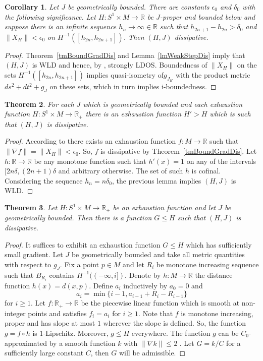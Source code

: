 \documentclass[11pt]{amsart}
\newcommand{\R}{\mathbb{R}}
\newtheorem{tm}{Theorem}[section]
\newtheorem{cy}[tm]{Corollary}
\theoremstyle{definition}
\theoremstyle{remark}
\begin{document}
\begin{cy}\label{cwWeakDisCofinal}
Let $J$ be geometrically bounded. There are constants $\epsilon_0$ and $\delta_0$ with the following significance. Let $H:S^1\times M\to\R$ be $J$-proper and bounded below and suppose there is an infinite sequence $h_n\to\infty\in\R$  such that $h_{2n+1}-h_{2n}>\delta_0$ and $\|X_H\|<\epsilon_0$ on $H^{-1}([ h_{2n},h_{2n+1}])$.  Then $(H,J)$ dissipative.
\end{cy}
\begin{proof}
Theorem~\ref{tmBoundGradDis} and Lemma~\ref{lmWeakStepDis} imply that $(H,J)$ is WLD and hence, by , strongly LDOS. Boundedness of $\|X_H\|$ on the sets $H^{-1}([ h_{2n},h_{2n+1}])$ implies quasi-isometry of$g_{J_H}$ with the product metric $ds^2+dt^2+g_J$ on these sets, which in turn implies i-boundedness.
\end{proof}
\begin{tm}\label{tmDregCofinal}For each $J$ which is geometrically bounded and each exhaustion function $H:S^1\times M\to\R_+$ there is an exhaustion function $H'>H$ which is such that $(H,J)$ is dissipative.
\end{tm}
\begin{proof}
According to \cite{GreeneWu}  there exists an exhaustion function $f:M\to \R$ such that $\|\nabla f\|=\|X_H\|<\epsilon_0$.  So, $f$ is dissipative by Theorem~\ref{tmBoundGradDis}.  Let $h:\R\to\R$ be any monotone function such that $h'(x)=1$ on any of the intervals $[2n\delta,(2n+1)\delta$ and arbitrary otherwise. The set of such $h$ is cofinal. Considering the sequence $h_n=n\delta_0$, the previous lemma implies $(H,J)$ is WLD.
\end{proof}
\begin{tm}\label{lmExDisDom}
Let $H:S^1\times M\to\R_+$ be an exhaustion function and let $J$ be geometrically bounded. Then there is a function $G\leq H$ such that $(H,J)$ is dissipative.
\end{tm}
\begin{proof}
It suffices to exhibit an exhaustion function $G\leq H$ which has sufficiently small gradient. Let $J$ be geometrically bounded and take all metric quantities with respect to $g_J$. Fix a point $p\in M$ and let $R_i$ be monotone increasing sequence such that $B_{R_i}$ contains $H^{-1}((-\infty,i])$. Denote by $h:M\to\R$ the distance function $h(x)=d(x,p)$. Define $a_i$ inductively by $a_0=0$ and
\[
a_i=\min\{i-1,a_{i-1}+R_i-R_{i-1}\}
\]
for $i\geq 1$. Let $f:\R_+\to\R$ be the piecewise linear function which is smooth at non-integer points and satisfies $f_i=a_i$ for $i\geq 1$. Note that $f$ is monotone increasing, proper and has slope at most $1$ wherever the slope is defined. So, the function $g=f\circ h$ is $1$-Lipschitz. Moreover, $g\leq H$ everywhere. The function $g$ can be $C_0$-approximated by a smooth function $k$ with $\|\nabla k\|\leq 2$ \cite{GreeneWu}. Let $G=k/C$ for a sufficiently large constant $C$, then $G$ will be admissible.
\end{proof}
\end{document}
